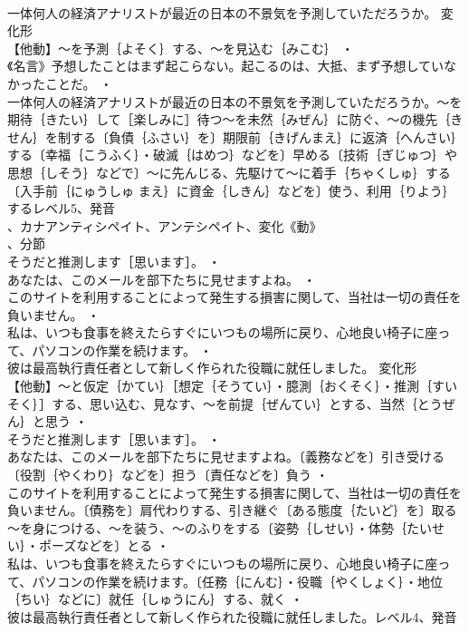 \documentclass[8pt]{extreport}
\begin{document}
\begin{CJK}{UTF8}{min}
\\	一体何人の経済アナリストが最近の日本の不景気を予測していただろうか。	変化形 
\\	【他動】～を予測｛よそく｝する、～を見込む｛みこむ｝ ・
\\	《名言》予想したことはまず起こらない。起こるのは、大抵、まず予想していなかったことだ。 ・
\\	一体何人の経済アナリストが最近の日本の不景気を予測していただろうか。～を期待｛きたい｝して［楽しみに］待つ～を未然｛みぜん｝に防ぐ、～の機先｛きせん｝を制する〔負債｛ふさい｝を〕期限前｛きげんまえ｝に返済｛へんさい｝する〔幸福｛こうふく｝・破滅｛はめつ｝などを〕早める〔技術｛ぎじゅつ｝や思想｛しそう｝などで〕～に先んじる、先駆けて～に着手｛ちゃくしゅ｝する〔入手前｛にゅうしゅ まえ｝に資金｛しきん｝などを〕使う、利用｛りよう｝するレベル5、発音
\\	、カナアンティシペイト、アンテシペイト、変化《動》
\\	、分節
\\	そうだと推測します［思います］。 ・
\\	あなたは、このメールを部下たちに見せますよね。 ・
\\	このサイトを利用することによって発生する損害に関して、当社は一切の責任を負いません。 ・
\\	私は、いつも食事を終えたらすぐにいつもの場所に戻り、心地良い椅子に座って、パソコンの作業を続けます。 ・
\\	彼は最高執行責任者として新しく作られた役職に就任しました。	変化形 
\\	【他動】～と仮定｛かてい｝［想定｛そうてい｝・臆測｛おくそく｝・推測｛すいそく｝］する、思い込む、見なす、～を前提｛ぜんてい｝とする、当然｛とうぜん｝と思う ・
\\	そうだと推測します［思います］。 ・
\\	あなたは、このメールを部下たちに見せますよね。〔義務などを〕引き受ける〔役割｛やくわり｝などを〕担う〔責任などを〕負う ・
\\	このサイトを利用することによって発生する損害に関して、当社は一切の責任を負いません。〔債務を〕肩代わりする、引き継ぐ〔ある態度｛たいど｝を〕取る～を身につける、～を装う、～のふりをする〔姿勢｛しせい｝・体勢｛たいせい｝・ポーズなどを〕とる ・
\\	私は、いつも食事を終えたらすぐにいつもの場所に戻り、心地良い椅子に座って、パソコンの作業を続けます。〔任務｛にんむ｝・役職｛やくしょく｝・地位｛ちい｝などに〕就任｛しゅうにん｝する、就く ・
\\	彼は最高執行責任者として新しく作られた役職に就任しました。レベル4、発音

\end{CJK}
\end{document}

